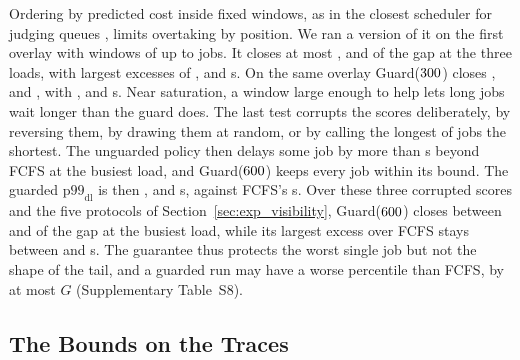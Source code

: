 Ordering by predicted cost inside fixed windows, as in the closest scheduler for judging
queues \cite{zhang2024ojscheduling}, limits overtaking by position. We ran a version of it
on the first overlay with windows of up to  jobs. It closes at most
,  and  of the gap at the three loads, with
largest excesses of ,  and  s. On the same overlay
Guard($300$) closes ,  and , with
,  and  s. Near saturation, a window large enough
to help lets long jobs wait longer than the guard does. The last test corrupts the scores
deliberately, by reversing them, by drawing them at random, or by calling the longest
 of jobs the shortest. The unguarded policy then delays some job by more than
 s beyond FCFS at the busiest load, and Guard($600$) keeps every job
within its bound. The guarded $\mathrm{p99}_{\mathrm{dl}}$ is then ,
 and  s, against FCFS's  s. Over these three
corrupted scores and the five protocols of Section~\ref{sec:exp_visibility}, Guard($600$)
closes between  and  of the gap at the busiest load, while
its largest excess over FCFS stays between  and  s. The guarantee thus
protects the worst single job but not the shape of the tail, and a guarded run may have a
worse percentile than FCFS, by at most $G$ (Supplementary Table~S8).

\subsection{The Bounds on the Traces}
\label{sec:exp_bound}
\label{sec:exp_k1}

